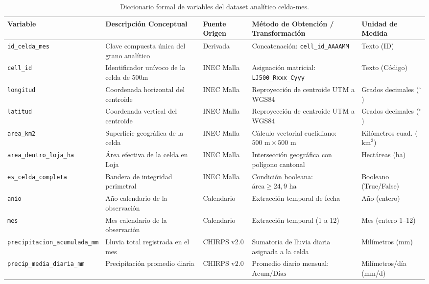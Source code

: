 \documentclass[11pt,a4paper]{article}
\begin{document}
\begin{table}[H]
\centering
\scriptsize
\setlength{\tabcolsep}{3pt}
\renewcommand{\arraystretch}{1.18}
\caption{Diccionario formal de variables del dataset anal\'itico celda-mes.}
\label{tab:diccionario_variables}
\begin{tabularx}{\textwidth}{@{}L{3.2cm}L{4.2cm}L{2.5cm}X C{2.2cm}@{}}
\toprule
\textbf{Variable} & \textbf{Descripci\'on Conceptual} & \textbf{Fuente Origen} & \textbf{M\'etodo de Obtenci\'on / Transformaci\'on} & \textbf{Unidad de Medida} \\
\midrule
\texttt{id\_celda\_mes} & Clave compuesta \'unica del grano anal\'itico & Derivada & Concatenaci\'on: \texttt{cell\_id\_AAAAMM} & Texto (ID) \\
\texttt{cell\_id} & Identificador un\'ivoco de la celda de 500m & INEC Malla & Asignaci\'on matricial: \texttt{LJ500\_Rxxx\_Cyyy} & Texto (C\'odigo) \\
\texttt{longitud} & Coordenada horizontal del centroide & INEC Malla & Reproyecci\'on de centroide UTM a WGS84 & Grados decimales ($^\circ$) \\
\texttt{latitud} & Coordenada vertical del centroide & INEC Malla & Reproyecci\'on de centroide UTM a WGS84 & Grados decimales ($^\circ$) \\
\texttt{area\_km2} & Superficie geogr\'afica de la celda & INEC Malla & C\'alculo vectorial euclidiano: $500\text{ m} \times 500\text{ m}$ & Kil\'ometros cuad. ($\text{km}^2$) \\
\texttt{area\_dentro\_loja\_ha} & \'Area efectiva de la celda en Loja & INEC Malla & Intersecci\'on geogr\'afica con pol\'igono cantonal & Hect\'areas (ha) \\
\texttt{es\_celda\_completa} & Bandera de integridad perimetral & INEC Malla & Condici\'on booleana: $\text{\'area} \ge 24,9\text{ ha}$ & Booleano (True/False) \\
\texttt{anio} & A\~no calendario de la observaci\'on & Calendario & Extracci\'on temporal de fecha & A\~no (entero) \\
\texttt{mes} & Mes calendario de la observaci\'on & Calendario & Extracci\'on temporal (1 a 12) & Mes (entero 1--12) \\
\texttt{precipitacion\_acumulada\_mm} & Lluvia total registrada en el mes & CHIRPS v2.0 & Sumatoria de lluvia diaria asignada a la celda & Mil\'imetros (mm) \\
\texttt{precip\_media\_diaria\_mm} & Precipitaci\'on promedio diaria & CHIRPS v2.0 & Promedio diario mensual: $\text{Acum} / \text{D\'ias}$ & Mil\'imetros/d\'ia (mm/d) \\

\end{tabularx}
\end{table}
\end{document}
